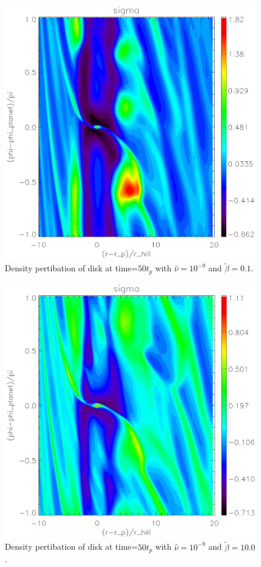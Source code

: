 \begin{figure}
   \includegraphics[scale=.60]{figures/analysis_sigma50lowb.ps}
   \caption{Density pertibation of disk at time=$50t_p$ with $\hat{\nu}=10^{-9}$ and $\tilde{\beta}=0.1$. }
 \label{shortterm_lowb)}
 \end{figure}

\begin{figure}
   \includegraphics[scale=.60]{figures/analysis_sigma50highb.ps}
   \caption{Density pertibation of disk at time=$50t_p$ with $\hat{\nu}=10^{-9}$ and $\tilde{\beta}=10.0$. }
 \label{shortterm_highb)}
 \end{figure}



